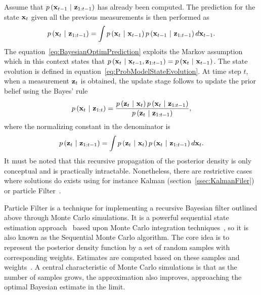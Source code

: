 Assume that $p \left( \mathbf{x}_{t - 1} \ | \ \mathbf{z}_{1:t - 1} \right)$ has already been computed. The prediction for the state $\mathbf{x}_t$ given all the previous measurements is then performed as
\begin{equation}
    \label{eq:BayesianOptimPrediction}
    p \left( \mathbf{x}_t \ | \ \mathbf{z}_{1:t - 1} \right) = \int p \left( \mathbf{x}_t \ | \ \mathbf{x}_{t - 1} \right) p \left( \mathbf{x}_{t - 1} \ | \ \mathbf{z}_{1:t - 1} \right) d\mathbf{x}_{t - 1}.
\end{equation}
The equation~\ref{eq:BayesianOptimPrediction} exploits the Markov assumption which in this context states that $p \left( \mathbf{x}_t \ | \ \mathbf{x}_{t - 1}, \mathbf{z}_{1:t - 1} \right) = p \left( \mathbf{x}_t \ | \ \mathbf{x}_{t - 1} \right)$. The state evolution is defined in equation~\ref{eq:ProbModelStateEvolution}. At time step $t$, when a measurement $\mathbf{z}_t$ is obtained, the update stage follows to update the prior belief using the Bayes' rule
\begin{equation}
    p \left( \mathbf{x}_t \ | \ \mathbf{z}_{1:t} \right) =
    \frac{
        p \left( \mathbf{z}_t \ | \ \mathbf{x}_{t} \right)
        p \left( \mathbf{x}_t \ | \ \mathbf{z}_{1:t - 1} \right)
    }{
        p \left( \mathbf{z}_t \ | \ \mathbf{z}_{1:t - 1} \right)
    },
\end{equation}
where the normalizing constant in the denominator is
\begin{equation}
    p \left( \mathbf{z}_t \ | \ \mathbf{z}_{1:t - 1} \right) =
    \int
    p \left( \mathbf{z}_t \ | \ \mathbf{x}_{t} \right)
    p \left( \mathbf{x}_t \ | \ \mathbf{z}_{1:t - 1} \right)
    d\mathbf{x}_t.
\end{equation}
It must be noted that this recursive propagation of the posterior density is only conceptual and is practically intractable. Nonetheless, there are restrictive cases where solutions do exists using for instance Kalman (section~\ref{ssec:KalmanFiler}) or particle Filter~\cite{arulampalam2007particlefilter}.

Particle Filter is a technique for implementing a recursive Bayesian filter outlined above through Monte Carlo simulations.  It is a powerful sequential state estimation approach~\cite{doucet2001introduction} based upon Monte Carlo integration techniques~\cite{mihaylova2007object}, so it is also known as the Sequential Monte Carlo algorithm. The core idea is to represent the posterior density function by a set of random samples with corresponding weights. Estimates are computed based on these samples and weights~\cite{arulampalam2007particlefilter}. A central characteristic of Monte Carlo simulations is that as the number of samples grows, the approximation also improves, approaching the optimal Bayesian estimate in the limit.

